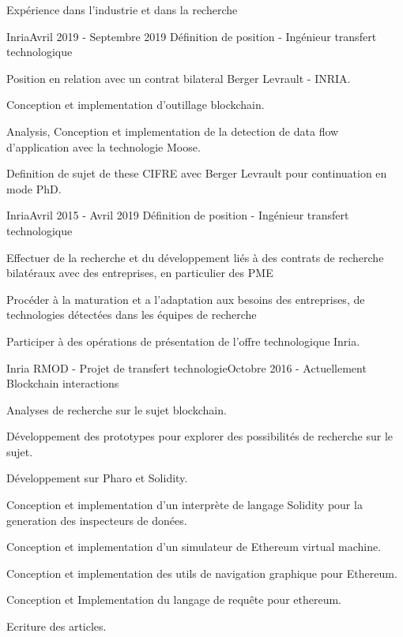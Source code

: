 \documentclass{resume} %
\begin{document}
\begin{rSection}{Exp\'{e}rience dans l'industrie et dans la recherche}


	\begin{rSubsection}{Inria}{Avril 2019 - Septembre 2019 }{D\'efinition de position - Ing\'{e}nieur transfert technologique}
		\item 
		\item  Position en relation avec un contrat bilateral Berger Levrault - INRIA.
		\item  Conception et implementation d'outillage blockchain.  
		\item  Analysis, Conception et implementation de la detection de data flow d'application avec la technologie Moose.
		\item  Definition de sujet de these CIFRE avec Berger Levrault pour continuation en mode PhD.
	\end{rSubsection}


	\begin{rSubsection}{Inria}{Avril 2015 - Avril 2019 }{D\'efinition de position - Ing\'{e}nieur transfert technologique}
		\item 
		\item Effectuer de la recherche et du d\'{e}veloppement li\'{e}s \`a des contrats de recherche bilat\'{e}raux avec des entreprises, en particulier des PME 
		\item Proc\'{e}der \`a la maturation et  a  l'adaptation aux besoins des entreprises, de technologies d\'{e}tect\'{e}es dans les \'{e}quipes de recherche 
		\item Participer  \`a  des op\'{e}rations de pr\'{e}sentation de l'offre technologique Inria. 
	\end{rSubsection}
	
	\begin{rSubsection}{Inria RMOD - Projet de transfert technologie}{Octobre 2016 - Actuellement }{Blockchain interactions}
		\item 
		\item Analyses de recherche sur le sujet blockchain. 
		\item D\'{e}veloppement des prototypes pour explorer des possibilit\'{e}s de recherche sur le sujet.
		\item D\'{e}veloppement sur Pharo et Solidity. 
		\item Conception et implementation d'un interpr\`{e}te de langage Solidity pour la generation des inspecteurs de don\'{e}es.
		\item Conception et implementation d'un simulateur de Ethereum virtual machine. 
		\item Conception et implementation des utils de navigation graphique pour Ethereum. 
		\item Conception et Implementation du langage de requ\^{e}te pour ethereum. 
		\item Ecriture des articles.
	\end{rSubsection}
	

\end{rSection}
\end{document}
